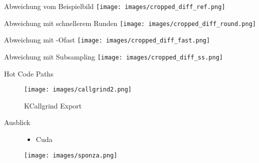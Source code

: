 	\begin{frame}{Abweichung vom Beispielbild}
		\center
		\texttt{[image: images/cropped\_diff\_ref.png]}
	\end{frame}
	\begin{frame}{Abweichung mit schnellerem Runden}
		\center
		\texttt{[image: images/cropped\_diff\_round.png]}
	\end{frame}
	\begin{frame}{Abweichung mit -Ofast}
		\center
		\texttt{[image: images/cropped\_diff\_fast.png]}
	\end{frame}
	\begin{frame}{Abweichung mit Subsampling}
		\center
		\texttt{[image: images/cropped\_diff\_ss.png]}
	\end{frame}

	\begin{frame}{Hot Code Paths}
		\begin{figure}[ht]
        	\begin{minipage}[b]{0.7\linewidth}
            \centering
            \texttt{[image: images/callgrind2.png]}
            \caption{KCallgrind Export}
            \label{fig:a}
        	\end{minipage}
	\end{figure}
	\end{frame}

	\begin{frame}{Ausblick}
		\begin{figure}[ht]
		\vspace{1cm}
        	\begin{minipage}{0.45\linewidth}
		\begin{itemize}
			\item Cuda
		\end{itemize}
		\vspace{4.5cm}
		\end{minipage}
		\begin{minipage}[b]{0.45\linewidth}
            \centering
            \texttt{[image: images/sponza.png]}
        	\end{minipage}
        	
	\end{figure}
		
	\end{frame}

